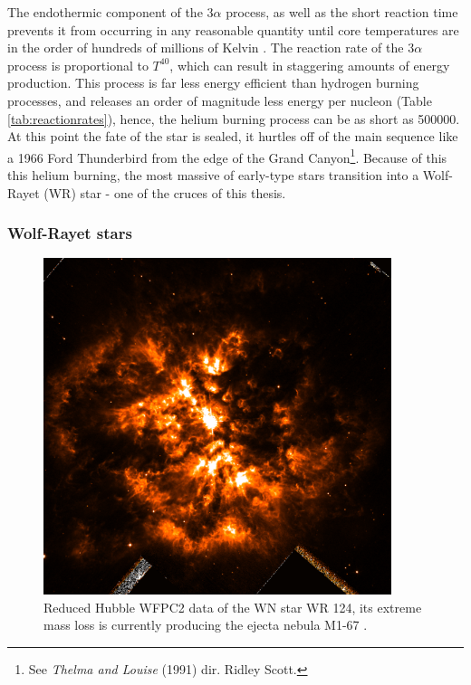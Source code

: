 \noindent
The endothermic component of the 3$\alpha$ process, as well as the short reaction time prevents it from occurring in any reasonable quantity until core temperatures are in the order of hundreds of millions of Kelvin
\parencite[Pt.~6]{kippenhahnStellarStructureEvolution2012}.
The reaction rate of the 3$\alpha$ process is proportional to $T^{40}$, which can result in staggering amounts of energy production.
This process is far less energy efficient than hydrogen burning processes, and releases an order of magnitude less energy per nucleon (Table \ref{tab:reactionrates}), hence, the helium burning process can be as short as \SI{500000}{\year}.
At this point the fate of the star is sealed, it hurtles off of the main sequence like a 1966 Ford Thunderbird from the edge of the Grand Canyon\footnote{See \emph{Thelma and Louise} (1991) dir. Ridley Scott.}.
Because of this this helium burning, the most massive of early-type stars transition into a Wolf-Rayet (WR) star - one of the cruces of this thesis.

\subsubsection{Wolf-Rayet stars}
\label{sec:wrtype}

\begin{figure}[ht]
  \centering
  \includegraphics[width=4in]{assets/WR124.png}
  \caption[\textit{M1-67 nebula around WR 124 \parencite{2010ApJ...724L..90M}}]{Reduced Hubble WFPC2 data of the WN star WR 124, its extreme mass loss is currently producing the ejecta nebula M1-67 \parencite{2010ApJ...724L..90M}.}
  \label{fig:wr124}
\end{figure}

